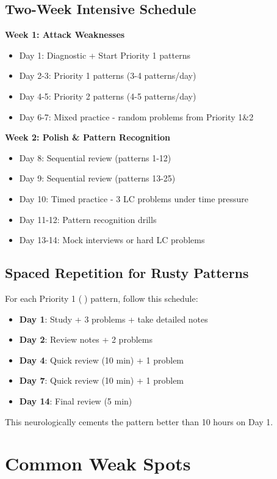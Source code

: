 \documentclass[10pt]{article}
\begin{document}
\subsection{Two-Week Intensive Schedule}

\textbf{Week 1: Attack Weaknesses}
\begin{itemize}
\item Day 1: Diagnostic + Start Priority 1 patterns
\item Day 2-3: Priority 1 patterns (3-4 patterns/day)
\item Day 4-5: Priority 2 patterns (4-5 patterns/day)
\item Day 6-7: Mixed practice - random problems from Priority 1\&2
\end{itemize}

\textbf{Week 2: Polish \& Pattern Recognition}
\begin{itemize}
\item Day 8: Sequential review (patterns 1-12)
\item Day 9: Sequential review (patterns 13-25)
\item Day 10: Timed practice - 3 LC problems under time pressure
\item Day 11-12: Pattern recognition drills
\item Day 13-14: Mock interviews or hard LC problems
\end{itemize}

\subsection{Spaced Repetition for Rusty Patterns}

For each Priority 1 (🔴) pattern, follow this schedule:
\begin{itemize}
\item \textbf{Day 1}: Study + 3 problems + take detailed notes
\item \textbf{Day 2}: Review notes + 2 problems
\item \textbf{Day 4}: Quick review (10 min) + 1 problem
\item \textbf{Day 7}: Quick review (10 min) + 1 problem
\item \textbf{Day 14}: Final review (5 min)
\end{itemize}

This neurologically cements the pattern better than 10 hours on Day 1.

\section{Common Weak Spots}
\end{document}
